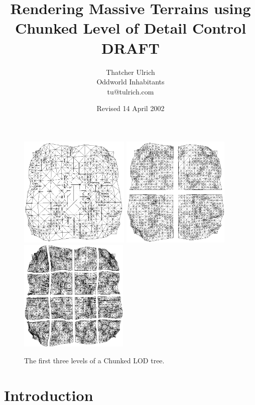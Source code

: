 \documentclass[12pt]{article}
\title{Rendering Massive Terrains using Chunked Level of Detail Control\\DRAFT}
\author{
	Thatcher Ulrich\\
	Oddworld Inhabitants\\
	tu@tulrich.com\\
}
\date{Revised 14 April 2002}
\begin{document}
\maketitle


\begin{figure}[h]
\centering
\includegraphics[height=2.1in]{sig-fig-tree1}
\includegraphics[height=2.1in]{sig-fig-tree2}
\includegraphics[height=2.1in]{sig-fig-tree3}
\caption{The first three levels of a Chunked LOD tree.}
\label{fig:tree}
\end{figure}


\section{Introduction}
\end{document}
